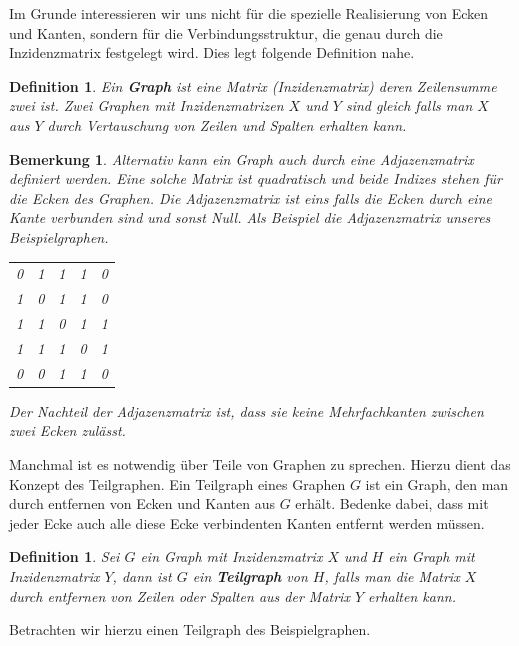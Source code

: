 \documentclass[11pt,a4paper,leqno]{report}
\newtheorem{definition}[theorem]{Definition}
\newtheorem{remark}[theorem]{Bemerkung}
\numberwithin{equation}{chapter}
\begin{document}
	Im Grunde interessieren wir uns nicht f\"ur die spezielle Realisierung von Ecken und Kanten, sondern f\"ur die Verbindungsstruktur, die genau durch die Inzidenzmatrix festgelegt wird. Dies legt folgende Definition nahe.
\begin{definition}
	Ein \textbf{Graph} ist eine Matrix (Inzidenzmatrix) deren Zeilensumme zwei ist. Zwei Graphen mit Inzidenzmatrizen $X$ und $Y$ sind gleich falls man $X$ aus $Y$ durch Vertauschung von Zeilen und Spalten erhalten kann.
\end{definition}
\begin{remark}
	Alternativ kann ein Graph auch durch eine Adjazenzmatrix definiert werden. Eine solche Matrix ist quadratisch und beide Indizes stehen f\"ur die Ecken des Graphen. Die Adjazenzmatrix ist eins falls die Ecken durch eine Kante verbunden sind und sonst Null. Als Beispiel die Adjazenzmatrix unseres Beispielgraphen.
	\begin{center}
	\begin{tabular}{c c c c c}
		0 & 1 & 1 & 1 & 0\\
		1 & 0 & 1 & 1 & 0\\
		1 & 1 & 0 & 1 & 1\\
		1 & 1 & 1 & 0 & 1\\
		0 & 0 & 1 & 1 & 0\\
	\end{tabular} 
\end{center}
	Der Nachteil der Adjazenzmatrix ist, dass sie keine Mehrfachkanten zwischen zwei Ecken zul\"asst.
\end{remark}
\noindent
Manchmal ist es notwendig \"uber Teile von Graphen zu sprechen. Hierzu dient das Konzept des Teilgraphen. Ein Teilgraph eines Graphen $G$ ist ein Graph, den man durch entfernen von Ecken und Kanten aus $G$ erh\"alt. Bedenke dabei, dass mit jeder Ecke auch alle diese Ecke verbindenten Kanten entfernt werden m\"ussen.
\begin{definition}
	Sei $G$ ein Graph mit Inzidenzmatrix $X$ und $H$ ein Graph mit Inzidenzmatrix $Y$, dann ist $G$ ein \textbf{Teilgraph} von $H$, falls man die Matrix $X$ durch entfernen von Zeilen oder Spalten aus der Matrix $Y$ erhalten kann.
\end{definition}
\noindent
Betrachten wir hierzu einen Teilgraph des Beispielgraphen.
\end{document}
